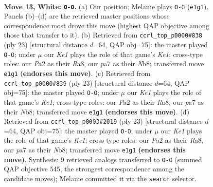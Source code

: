 \documentclass[11pt]{article}
\begin{document}
\clearpage

\begin{figure}[p]\centering
\begin{subfigure}{0.46\textwidth}\centering
\resizebox{\linewidth}{!}{%
\newchessgame
\chessboard[
  setfen={rn1qk2r/p3bp2/b4np1/2pp3p/8/1PN3PN/P2BPPBP/R2QK2R w KQkq - 0 13},
  showmover=false,
  pgfstyle=straightmove, color=movearrow, markmove={e1-g1}
]}
\caption{}
\end{subfigure}\hfill
\begin{subfigure}{0.46\textwidth}\centering
\resizebox{\linewidth}{!}{%
\newchessgame
\chessboard[
  setfen={rn1qk2r/1b2bppp/p2p1n2/P1pP4/2B5/2N2N2/1P3PPP/R1BQK2R b KQkq - 4 12},
  showmover=false,
  pgfstyle=straightmove, color=movearrow, markmove={e8-g8}
]}
\caption{}
\end{subfigure}
\\[4pt]
\begin{subfigure}{0.46\textwidth}\centering
\resizebox{\linewidth}{!}{%
\newchessgame
\chessboard[
  setfen={rn1qk2r/1b2bppp/p2p1n2/P1pP4/2B5/2N2N2/1P3PPP/R1BQK2R b KQkq - 4 12},
  showmover=false,
  pgfstyle=straightmove, color=movearrow, markmove={e8-g8}
]}
\caption{}
\end{subfigure}\hfill
\begin{subfigure}{0.46\textwidth}\centering
\resizebox{\linewidth}{!}{%
\newchessgame
\chessboard[
  setfen={rn1qk2r/1b2bppp/p2p1n2/P1pP4/2B5/2N2N2/1P3PPP/R1BQK2R b KQkq - 4 12},
  showmover=false,
  pgfstyle=straightmove, color=movearrow, markmove={e8-g8}
]}
\caption{}
\end{subfigure}
\caption{\textbf{Move 13, White: \texttt{O-O}.} (a) Our position; Melanie plays \texttt{O-O} (\texttt{e1g1}). Panels (b)--(d) are the retrieved master positions whose correspondence most drove this move (highest QAP objective among those that transfer to it). (b) Retrieved from \texttt{ccrl\_top\_p0000\#838} (ply 23) [structural distance $d$=64, QAP obj=75]: the master played \texttt{O-O}; under $\mu$ our \emph{Ke1} plays the role of that game's \emph{Ke1}; cross-type roles: our \emph{P}a2 as their \emph{R}a8, our \emph{p}a7 as their \emph{N}b8; transferred move \texttt{e1g1} \textbf{(endorses this move)}. (c) Retrieved from \texttt{ccrl\_top\_p0000\#839} (ply 23) [structural distance $d$=64, QAP obj=75]: the master played \texttt{O-O}; under $\mu$ our \emph{Ke1} plays the role of that game's \emph{Ke1}; cross-type roles: our \emph{P}a2 as their \emph{R}a8, our \emph{p}a7 as their \emph{N}b8; transferred move \texttt{e1g1} \textbf{(endorses this move)}. (d) Retrieved from \texttt{ccrl\_top\_p0003\#2019} (ply 23) [structural distance $d$=64, QAP obj=75]: the master played \texttt{O-O}; under $\mu$ our \emph{Ke1} plays the role of that game's \emph{Ke1}; cross-type roles: our \emph{P}a2 as their \emph{R}a8, our \emph{p}a7 as their \emph{N}b8; transferred move \texttt{e1g1} \textbf{(endorses this move)}. Synthesis: 9 retrieved analogs transferred to \texttt{O-O} (summed QAP objective 545, the strongest correspondence among the candidate moves); Melanie committed it via the \texttt{search} selector.}
\label{fig:thought-m24}
\end{figure}
\end{document}

